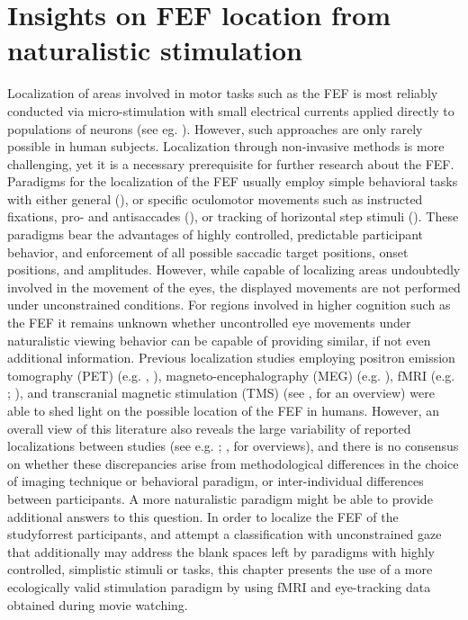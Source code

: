 \documentclass[a4paper, 12pt]{scrreprt}
\begin{document}
\section{Insights on FEF location from naturalistic stimulation}\label{section:shortcomings}
Localization of areas involved in motor tasks such as the FEF is most reliably conducted via micro-stimulation with small electrical currents applied directly to populations of neurons (see eg. \cite{bruce1985primate}). However, such approaches are only rarely possible in human subjects. Localization through non-invasive methods is more challenging, yet it is a necessary prerequisite for further research about the FEF. Paradigms for the localization of the FEF usually employ simple behavioral tasks with either general (\cite{paus1996location}), or specific oculomotor movements such as instructed fixations, pro- and antisaccades (\cite{connolly2002human}), or tracking of horizontal step stimuli (\cite{alkan2011differentiation}). These paradigms bear the advantages of highly controlled, predictable participant behavior, and enforcement of all possible saccadic target positions, onset positions, and amplitudes. However, while capable of localizing areas undoubtedly involved in the movement of the eyes, the displayed movements are not performed under unconstrained conditions. For regions involved in higher cognition such as the FEF it remains unknown whether uncontrolled eye movements under naturalistic viewing behavior can be capable of providing similar, if not even additional information. Previous localization studies employing positron emission tomography (PET) (e.g. \textcite{paus1996location}, \cite{kawashima1998oculomotor}), magneto-encephalography (MEG) (e.g. \cite{ioannides2004meg}), fMRI (e.g. \cite{petit1999functional}; \cite{connolly2002human}), and transcranial magnetic stimulation (TMS) (see \textcite{vernet2014corrigendum}, for an overview) were able to shed light on the possible location of the FEF in humans. However, an overall view of this literature also reveals the large variability of reported localizations between studies (see e.g. \textcite{paus1996location}; \textcite{vernet2014corrigendum}, for overviews), and there is no consensus on whether these discrepancies arise from methodological differences in the choice of imaging technique or behavioral paradigm, or inter-individual differences between participants. A more naturalistic paradigm might be able to provide additional answers to this question. \newline
In order to localize the FEF of the studyforrest participants, and attempt a classification with unconstrained gaze that additionally may address the blank spaces left by paradigms with highly controlled, simplistic stimuli or tasks, this chapter presents the use of a more ecologically valid stimulation paradigm by using fMRI and eye-tracking data obtained during movie watching. 
\end{document}
